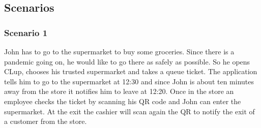 \begin{description}



        \item \textbf{}




        \item \textbf{}



    \end{description}

	\clearpage
    \subsection{Scenarios}
		\subsubsection{Scenario 1}
		John has to go to the supermarket to buy some groceries. Since there is a pandemic going on, he would like to go there as safely as possible.\newline
		So he opens CLup, chooses his trusted supermarket and takes a queue ticket. The application tells him to go to the supermarket at 12:30 and since John is about ten minutes away from the store it notifies him to leave at 12:20. Once in the store an employee checks the ticket by scanning his QR code and John can enter the supermarket.
		At the exit the cashier will scan again the QR to notify the exit of a customer from the store.
